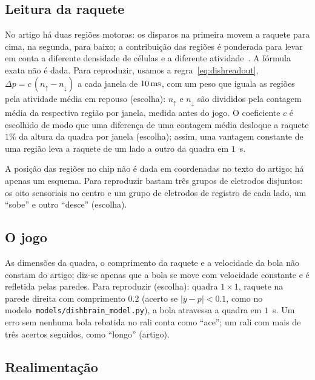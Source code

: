 \subsection*{Leitura da raquete}

No artigo há duas regiões motoras: os disparos na primeira movem a raquete para cima, na segunda, para baixo; a contribuição das regiões é ponderada para levar em conta a diferente densidade de células e a diferente atividade~\cite{Kagan2022}. A fórmula exata não é dada. Para reproduzir, usamos a regra~\eqref{eq:dishreadout}, $\Delta p=c\,(n_\uparrow-n_\downarrow)$ a cada janela de $10\,\text{ms}$, com um peso que iguala as regiões pela atividade média em repouso (escolha): $n_\uparrow$ e $n_\downarrow$ são divididos pela contagem média da respectiva região por janela, medida antes do jogo. O coeficiente $c$ é escolhido de modo que uma diferença de uma contagem média desloque a raquete $1\%$ da altura da quadra por janela (escolha); assim, uma vantagem constante de uma região leva a raquete de um lado a outro da quadra em $1$~s.

A posição das regiões no chip não é dada em coordenadas no texto do artigo; há apenas um esquema. Para reproduzir bastam três grupos de eletrodos disjuntos: os oito sensoriais no centro e um grupo de eletrodos de registro de cada lado, um ``sobe'' e outro ``desce'' (escolha).

\subsection*{O jogo}

As dimensões da quadra, o comprimento da raquete e a velocidade da bola não constam do artigo; diz-se apenas que a bola se move com velocidade constante e é refletida pelas paredes. Para reproduzir (escolha): quadra $1\times1$, raquete na parede direita com comprimento $0.2$ (acerto se $|y-p|<0.1$, como no modelo~\texttt{models/dishbrain\_model.py}), a bola atravessa a quadra em $1$~s. Um erro sem nenhuma bola rebatida no rali conta como ``ace''; um rali com mais de três acertos seguidos, como ``longo'' (artigo).

\subsection*{Realimentação}

